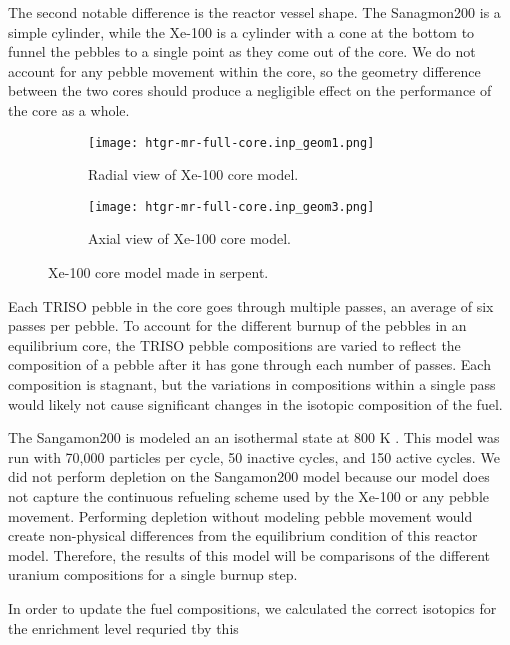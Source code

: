 The second 
notable difference is the reactor vessel shape. The Sanagmon200 is a simple 
cylinder, while the Xe-100 is a cylinder with a cone at the bottom to funnel 
the pebbles to a single point as they come out of the core. We do not account 
for any pebble movement within the core, so the geometry difference between 
the two cores should produce a negligible effect on the performance of the 
core as a whole.

\begin{figure}
    \centering 
    \begin{subfigure}{0.45\textwidth}
        \centering 
        \texttt{[image: htgr-mr-full-core.inp\_geom1.png]}
        \caption{Radial view of Xe-100 core model.}
        \label{fig:xe100_core_radial}        
    \end{subfigure}
    \hfill
    \begin{subfigure}{0.45\textwidth}
        \centering 
        \texttt{[image: htgr-mr-full-core.inp\_geom3.png]}
        \caption{Axial view of Xe-100 core model.}
        \label{fig:xe100_core_axial}        
    \end{subfigure}
    \caption{Xe-100 core model made in serpent.}
    \label{fig:xe100_core}
\end{figure}

Each \gls{TRISO} pebble in the core goes through multiple passes, an average 
of six passes per pebble. To account for the different burnup of 
the pebbles in an equilibrium core, the \gls{TRISO} pebble compositions are 
varied to reflect the composition of a pebble after it has gone through 
each number of passes. Each composition is stagnant, 
but the variations in 
compositions within a single pass would likely not cause significant 
changes in the isotopic composition of the fuel. 

The Sangamon200 is modeled an an isothermal state at 800 K \cite{richter_isotopic_2022}.
This model was run with 70,000 particles per cycle, 50 inactive cycles, 
and 150 active cycles. We did not perform depletion on the Sangamon200 model 
because our model 
does not capture the continuous refueling scheme used by the Xe-100 or 
any pebble movement. Performing depletion without modeling pebble movement 
would create non-physical differences from the equilibrium condition of 
this reactor model. Therefore, the results of this model will be comparisons
of the different uranium compositions for a single burnup step.

In order to update the fuel compositions, we calculated the correct 
isotopics for the enrichment level requried tby this

